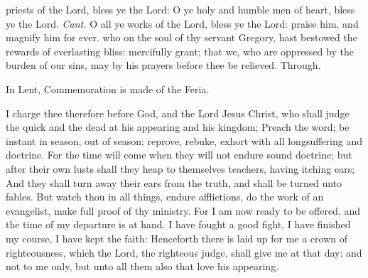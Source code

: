 \introit
{} priests of the Lord, bless ye the Lord: O ye holy and humble
men of heart, bless ye the Lord. \textit{Cant.} O all ye works of the Lord, bless ye the Lord: praise him, and magnify him for ever.
\collect
{} who on the soul of thy servant Gregory, hast bestowed the rewards of everlasting bliss: mercifully grant; that we, who are oppressed by the burden of our sins, may by his prayers before thee be relieved. Through.
\begin{rubric}
    In Lent, Commemoration is made of the Feria.%
\end{rubric}
 I charge thee therefore before God, and the Lord Jesus Christ, who shall judge the quick and the dead at his appearing and his kingdom; Preach the word; be instant in season, out of season; reprove, rebuke, exhort with all longsuffering and doctrine. For the time will come when they will not endure sound doctrine; but after their own lusts shall they heap to themselves teachers, having itching ears; And they shall turn away their ears from the truth, and shall be turned unto fables. But watch thou in all things, endure afflictions, do the work of an evangelist, make full proof of thy ministry. For I am now ready to be offered, and the time of my departure is at hand. I have fought a good fight, I have finished my course, I have kept the faith: Henceforth there is laid up for me a crown of righteousness, which the Lord, the righteous judge, shall give me at that day: and not to me only, but unto all them also that love his appearing.


\vspace{-1ex}

